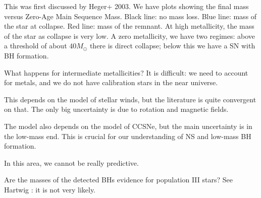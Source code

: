 \documentclass[main.tex]{subfiles}
\begin{document}
This was first discussed by Heger+ 2003. 
We have plots showing the final mass versus Zero-Age Main Sequence Mass. 
Black line: no mass loss. Blue line: mass of the star at collapse. Red line: mass of the remnant. 
At high metallicity, the mass of the star as collapse is very low.
A zero metallicity, we have two regimes: above a threshold of about \(40 M_{\odot}\) there is direct collapse; below this we have a SN with BH formation. 

What happens for intermediate metallicities? 
It is difficult: we need to account for metals, and we do not have calibration stars in the near universe. 

This depends on the model of stellar winds, but the literature is quite convergent on that. The only big uncertainty is due to rotation and magnetic fields. 

The model also depends on the model of CCSNe, but the main uncertainty is in the low-mass end. This is crucial for our understanding of NS and low-mass BH formation. 

In this area, we cannot be really predictive. 

Are the masses of the detected BHs evidence for population III stars? 
See Hartwig \cite[]{hartwigGravitationalWavesRemnants2016}: it is not very likely. 
\end{document}
